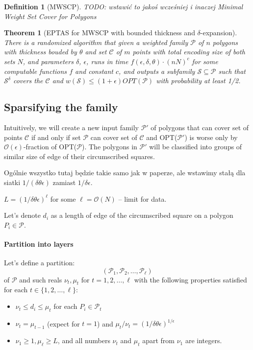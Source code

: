 \documentclass[en]{pracamgr}
\newtheorem{defi}{Definition}[section]
\newtheorem{tw}{Theorem}[section]
\begin{document}
\begin{defi}[MWSCP]
	TODO: wstawić to jakoś wcześniej i inaczej
	Minimal Weight Set Cover for Polygons
\end{defi}

\begin{tw}[EPTAS for MWSCP with bounded thickness and $\delta$-expansion]
There is a randomized algorithm that given
a weighted family $\mathcal{P}$ of $n$ polygons
with thickness bouded by $\theta$
and set $\mathcal{C}$ of $m$ points
with total encoding
size of both sets $N$, and parameters $\delta$, $\epsilon$,
runs in time $f(\epsilon, \delta, \theta) \cdot (nN)^c$
for some computable functions $f$ and constant $c$,
and outputs a subfamily $\mathcal{S} \subseteq \mathcal{P}$
such that $\mathcal{S}^{\delta}$
covers the $\mathcal{C}$
and $w(\mathcal{S}) \le (1+\epsilon)OPT(\mathcal{P})$
with probability at least 1/2.
\end{tw}

\subsection{Sparsifying the family}
Intuitively, we will create a new input family
$\mathcal{P'}$ of polygons that 
can cover set of points $\mathcal{C}$
if and only if set $\mathcal{P}$
can cover set of $\mathcal{C}$
and OPT($\mathcal{P'}$)
is worse only by $\mathcal{O}(\epsilon)$-fraction of OPT($\mathcal{P}$).
The polygons in $\mathcal{P'}$ will be classified
into groups of similar size of edge of their
circumscribed squares.

Ogólnie wszystko tutaj będzie takie samo jak
w paperze, ale wstawimy stałą dla siatki 
$1/(\delta\theta\epsilon)$
zamiast $1/\delta\epsilon$.

$L = (1/\delta\theta\epsilon)^{\ell}$
for some $\ell = \mathcal{O}(N)$ -- limit for data.

Let's denote $d_i$ as a length of edge of the
circumscribed square on a polygon $P_i \in \mathcal{P}$.

\paragraph{Partition into layers}
Let's define a partition:
$$(\mathcal{P}_1, \mathcal{P}_2, \ldots, \mathcal{P_{\ell}})$$
of $\mathcal{P}$ and such reals $\nu_t, \mu_t$
for $t = 1, 2, \ldots, \ell$ with
the following properties satisfied for each $t \in \{1,2,\ldots, \ell\}$:
\begin{itemize}
\item $\nu_t \le d_i \le \mu_t$ for each $P_i \in \mathcal{P}_t$
\item $\nu_t = \mu_{t-1}$ (expect for $t=1$) and $\mu_t/\nu_t = (1/\delta\theta\epsilon)^{1/\epsilon}$
\item $\nu_1 \ge 1, \mu_\ell \ge L$, and all numbers $\nu_t$ and $\mu_t$ apart from $\nu_1$ are integers.
\end{itemize}
\end{document}
